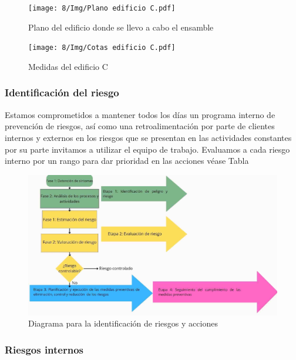     \begin{figure}[H]
        \centering
        \texttt{[image: 8/Img/Plano edificio C.pdf]}
        \caption{Plano del edificio donde se llevo a cabo el ensamble}
        \label{Edificio C}
    \end{figure}
    \begin{figure}[H]
        \centering
        \texttt{[image: 8/Img/Cotas edificio C.pdf]}
        \caption{Medidas del edificio C}
        \label{Cotas edifciio C}
    \end{figure}
    \subsubsection{Identificación del riesgo}
    Estamos comprometidos a mantener todos los días un programa interno de prevención de riesgos, así como una retroalimentación por parte de clientes internos y externos en los riesgos que se presentan en las actividades constantes por su parte invitamos a utilizar el equipo de trabajo.
    Evaluamos a cada riesgo interno por un rango para dar prioridad en las acciones véase Tabla
    \begin{figure}[H]
        \centering
        \includegraphics[trim = {1mm 1mm 1mm 1mm},clip,scale=0.3]{8/Img/Diagrama para la identiicacion de riesgos.pdf}
        \caption{Diagrama para la identificación de riesgos y acciones}
        \label{Diagrama para la identiicacion de riesgos}
    \end{figure}
    \subsubsection{Riesgos internos}
    
